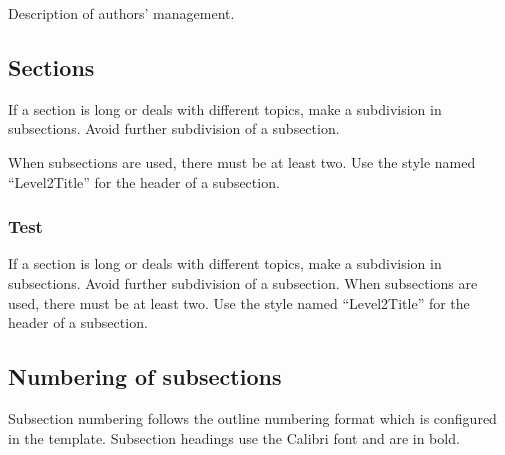 \documentclass[10pt]{imeko_acta}
\begin{document}
Description of authors' management.

\subsection{Sections}

If a section is long or deals with different topics, make a subdivision in subsections. Avoid further subdivision of a subsection. 

When subsections are used, there must be at least two. Use the style named ``Level2Title'' for the header of a subsection.

\subsubsection{Test}
If a section is long or deals with different topics, make a subdivision in subsections. Avoid further subdivision of a subsection. When subsections are used, there must be at least two. Use the style named ``Level2Title'' for the header of a subsection.


\subsection{Numbering of subsections}

Subsection numbering follows the outline numbering format which is configured in the template. Subsection headings use the Calibri font and are in bold.




\end{document}
